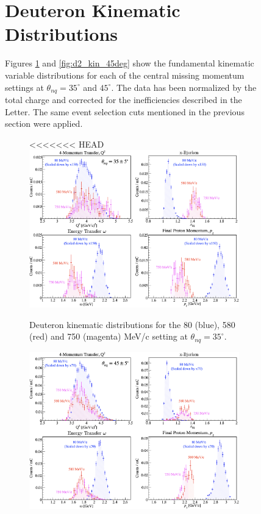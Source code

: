 \documentclass[aps, prl]{revtex4-2}  %
\begin{document}
\begin{figure}[!h]
\section{\large Deuteron Kinematic Distributions }
\indent Figures \ref{fig:d2_kin_35deg} and \ref{fig:d2_kin_45deg} show the fundamental kinematic variable distributions for each of the
central missing momentum settings at $\theta_{nq}=35^{\circ}$ and $45^{\circ}$. The data has been normalized by the total charge and corrected
for the inefficiencies described in the Letter. The same event selection cuts mentioned in the previous section were applied. 
\begin{figure}[!h]
<<<<<<< HEAD
\includegraphics[scale=0.17]{plots/d2_kin_thnq35.png}
\caption{Deuteron kinematic distributions for the 80 (blue), 580 (red) and 750 (magenta) MeV/c setting at $\theta_{nq}=35^{\circ}$.}
\label{fig:d2_kin_35deg}
\end{figure}
\begin{figure}[!h]
\includegraphics[scale=0.17]{plots/d2_kin_thnq45.png}

\end{figure}
\end{figure}
\end{document}
